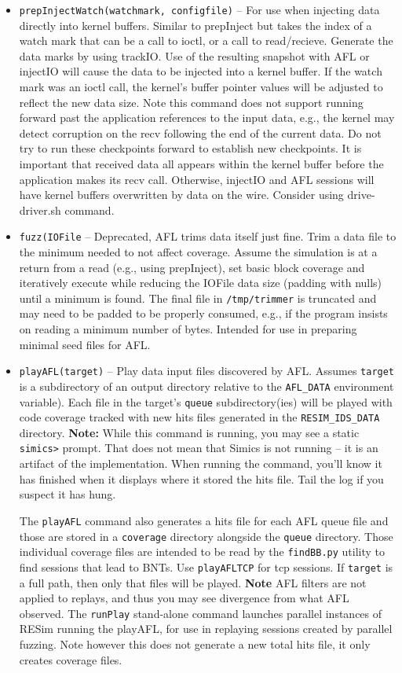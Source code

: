 \documentclass[titlepage]{article}
\begin{document}
\begin{itemize}
\item{\tt prepInjectWatch(watchmark, configfile)} -- For use when injecting data directly into kernel buffers.  Similar to prepInject but takes the index of a watch 
mark that can be a call to ioctl, or a call to read/recieve. Generate the data marks by using trackIO.   
Use of the resulting snapshot with AFL or injectIO will cause the data to be injected
into a kernel buffer. If the watch mark was an ioctl call, the kernel's buffer pointer values will be adjusted to reflect the new data size.  Note this command does not support running forward past the application
references to the input data, e.g., the kernel may detect corruption on the recv following the end of the current data.
Do not try to run these checkpoints forward to establish new checkpoints.
It is important that received data all appears within the kernel buffer before the application makes its recv call.  Otherwise, injectIO and AFL sessions
will have kernel buffers overwritten by data on the wire.  Consider using drive-driver.sh command.

\item{\tt fuzz(IOFile} -- Deprecated, AFL trims data itself just fine.  Trim a data file to the minimum needed to not affect coverage. Assume the simulation is at 
a return from a read (e.g., using prepInject), set basic block coverage and iteratively execute while reducing the
IOFile data size (padding with nulls) until a minimum is found.  The final file in {\tt /tmp/trimmer} is truncated and may need to be padded to be properly consumed, e.g.,
if the program insists on reading a minimum number of bytes.  Intended for use in preparing minimal seed files for AFL.

\item{\tt playAFL(target)} -- Play data input files discovered by AFL.  Assumes {\tt target} is a subdirectory of an output directory 
relative to the {\tt AFL\_DATA} environment variable).  
Each file in the target's {\tt queue} subdirectory(ies) will be played with code coverage tracked with new hits files generated in the {\tt RESIM\_IDS\_DATA} directory.
\textbf{Note:} While this command is running, you may see a static {\tt simics>} prompt.  That does not mean that Simics is not running -- it is an artifact of the implementation.  When running the command, you'll know it has finished when it displays where it stored the hits file.
Tail the log if you suspect it has hung.

The {\tt playAFL} command also generates a hits file for each AFL queue file and those are stored in a {\tt coverage} directory alongside the {\tt queue} directory.
Those individual coverage files are intended to be read by the {\tt findBB.py} utility to find sessions that lead to BNTs.  Use {\tt playAFLTCP} for tcp sessions.
If {\tt target} is a full path, then only that files will be played.  \textbf{Note} AFL filters are not applied to replays, and thus you may see divergence from what AFL observed.
The {\tt runPlay} stand-alone command launches parallel instances of RESim running the playAFL, for use in replaying sessions created by parallel fuzzing.  Note however this 
does not generate a new total hits file, it only creates coverage files.


\end{itemize}
\end{document}
